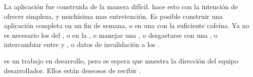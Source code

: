 La aplicación fue construida de la manera difícil. \meteor hace esto con la intención de ofrecer simpleza, y muchísima mas entretención. Es posible construir una aplicación completa en un fin de semana, o en una \hackathon con la suficiente cafeína. Ya no es necesario los \resources del \server, o \deploy \api \apiendpoints en la \cloud, o manejar una \dataBase, o desgastarse con una \orm \layer, o intercambiar \backandforth entre \javaScript y \ruby, o \broadcast datos de invalidación a los \clients.

\meteor es un trabajo en desarrollo, pero se espera que muestra la dirección del equipo desarrollador. Ellos están deseosos de recibir \feedback. 

